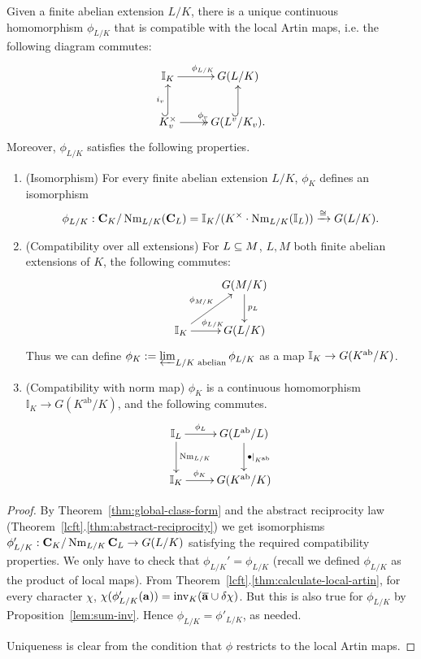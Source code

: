 \begin{thm*}
Given a finite abelian extension $L/K$, there is a unique continuous %
homomorphism $\phi_{L/K}$ that is compatible with the local Artin maps, i.e. the following diagram commutes: %
\[
\xymatrix{
\mathbb I_K\ar[r]^{\phi_{L/K}}&G(L/K)\\
K_v^{\times}\ar@{->>}[r]^{\phi_v}\ar@{^(->}[u]^{i_v}&
G(L^v/K_v).\ar@{^(->}[u]
}
\]
Moreover, $\phi_{L/K}$ satisfies the following properties.
\begin{enumerate}
\item (Isomorphism) For every finite abelian extension $L/K$, $\phi_K$ defines an isomorphism
\[
\phi_{L/K}:
\mathbf C_K/\operatorname{Nm}_{L/K}(\mathbf C_L)=
\mathbb I_K/(K^{\times}\cdot \operatorname{Nm}_{L/K}(\mathbb I_L))\xrightarrow{\cong} G(L/K).
\]
\item (Compatibility over all extensions) For $L\subseteq M$, $L,M$ both finite abelian extensions of $K$, the following commutes:
\[
\xymatrix{
& G(M/K)\ar[d]^{p_L}\\
\I_K\ar[ru]^{\phi_{M/K}}\ar[r]^{\phi_{L/K}}& G(L/K)
}
\]
Thus we can define $\phi_K:=\varprojlim_{L/K\text{ abelian}} \phi_{L/K}$ as a map $\mathbb{I}_K\to G(K^{\text{ab}}/K)$.
\item (Compatibility with norm map) $\phi_K$ is a continuous homomorphism $\mathbb{I}_K\to G(K^{\text{ab}}/K)$, and the following commutes.
\[
\xymatrix{
\I_L\ar[r]^-{\phi_L} \ar[d]^{\nm_{L/K}}& G(L^{\text{ab}}/L)\ar[d]^{\bullet|_{K^{\text{ab}}}}\\
\I_K\ar[r]^-{\phi_K}&  G(K^{\text{ab}}/K)
}
\]
\end{enumerate}
\end{thm*}
\begin{proof}
By Theorem~\ref{thm:global-class-form} and the abstract reciprocity law (Theorem~\ref{lcft}.\ref{thm:abstract-reciprocity}) we get isomorphisms $\phi_{L/K}':\mathbf C_K/\operatorname{Nm}_{L/K}\mathbf C_L\to G(L/K)$ satisfying the required compatibility properties. We only have to check that $\phi_{L/K}'=\phi_{L/K}$ (recall we defined $\phi_{L/K}$ as the product of local maps).
From Theorem~\ref{lcft}.\ref{thm:calculate-local-artin}, for every character $\chi$, $\chi(\phi'_{L/K}(\mathbf a))=\operatorname{inv}_K(\overline{\mathbf a}\cup \delta\chi)$. But this is also true for $\phi_{L/K}$ by Proposition~\ref{lem:sum-inv}. Hence $\phi_{L/K}=\phi'_{L/K}$, as needed.

Uniqueness is clear from the condition that $\phi$ restricts to the local Artin maps.
\end{proof}
